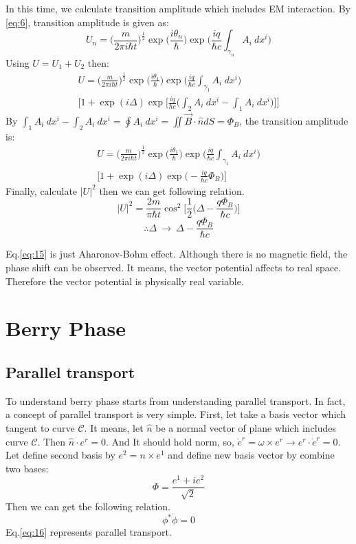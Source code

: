 \documentclass[%
 reprint,
 amsmath,amssymb,
 aps,
]{revtex4-1}
\begin{document}
In this time, we calculate transition amplitude which includes EM interaction. By \eqref{eq:6}, transition amplitude is given as:
\begin{equation}\label{eq:11}
U_n=\Big(\frac{m}{2\pi i\hbar t}\Big)^{\frac{1}{2}}\exp\Big(\frac{i\theta_n}{\hbar}\Big)\exp\Big(\frac{iq}{\hbar c}\int_{\gamma_n}A_i\ dx^i\Big)
\end{equation}
Using \(U=U_1+U_2\) then:
\begin{multline}\label{eq:12}
U=\Big(\frac{m}{2\pi i\hbar t}\Big)^{\frac{1}{2}}\exp\Big(\frac{i\theta_1}{\hbar}\Big)\exp\Big(\frac{iq}{\hbar c}\int_{\gamma_1}A_i\ dx^i\Big)\\ \Big[1+\exp(i\Delta)\exp\Big[\frac{iq}{\hbar c} \Big(\int_{2}A_i\ dx^i - \int_{1}A_i\ dx^i \Big)\Big]\Big]
\end{multline}
By \(\int_{1}A_i\ dx^i - \int_{2}A_i\ dx^i=\oint A_i\ dx^i=\iint \vec{B}\cdot\hat{n}dS=\Phi_B\), the transition amplitude is:
\begin{multline}\label{eq:13}
U=\Big(\frac{m}{2\pi i\hbar t}\Big)^{\frac{1}{2}}\exp\Big(\frac{i\theta_1}{\hbar}\Big) \exp\Big(\frac{iq}{\hbar c}\int_{\gamma_1}A_i\ dx^i\Big)\\ \Big[1+\exp(i\Delta)\exp\Big(-\frac{iq}{\hbar c} \Phi_B\Big)\Big]
\end{multline}
Finally, calculate $|U|^2$ then we can get following relation.
\begin{equation}\label{eq:14}
|U|^2=\frac{2m}{\pi\hbar t}\cos^2\Big[\frac{1}{2}\Big(\Delta-\frac{q\Phi_B}{\hbar c}\Big)\Big]
\end{equation}
\begin{equation}\label{eq:15}
\therefore\Delta\ \rightarrow\ \Delta-\frac{q\Phi_B}{\hbar c}
\end{equation}

Eq.\eqref{eq:15} is just Aharonov-Bohm effect. Although there is no magnetic field, the phase shift can be observed. It means, the vector potential affects to real space. Therefore the vector potential is physically real variable.

\section{\label{sec:level3}Berry Phase}
\subsection{\label{sec:level3.1}Parallel transport}
To understand berry phase starts from understanding parallel transport. In fact, a concept of parallel transport is very simple. First, let take a basis vector which tangent to curve $\mathcal{C}$. It means, let $\hat{n}$ be a normal vector of plane which includes curve $\mathcal{C}$. Then \(\hat{n}\cdot e^r=0\). And It should hold norm, so, \(\dot{e}^r=\omega\times e^r \rightarrow e^r \cdot \dot{e}^r=0\). Let define second basis by \(e^2 = n \times e^1\) and define new basis vector by combine two bases:
\[\Phi=\frac{e^1 + ie^2}{\sqrt{2}}\]
Then we can get the following relation.\cite{pt}
\begin{equation}\label{eq:16}
\phi^{*}\dot{\phi}=0
\end{equation}
Eq.\eqref{eq:16} represents parallel transport.
\end{document}

